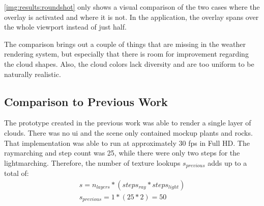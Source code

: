 \begin{figure}[H]
    \centering
    \label{img:results:roundshot}
\end{figure}

\noindent
\autoref{img:results:roundshot} only shows a visual comparison of the two cases where the overlay is activated and where it is not.
In the application, the overlay spans over the whole viewport instead of just half.

\noindent
The comparison brings out a couple of things that are missing in the weather rendering system, but especially that there is room for improvement regarding the cloud shapes.
Also, the cloud colors lack diversity and are too uniform to be naturally realistic.

\clearpage

\subsection{Comparison to Previous Work}
\label{section:techimpl:comparison}
The prototype created in the previous work was able to render a single layer of clouds. There was no \gls{ui} and the scene only contained mockup plants and rocks.
That implementation was able to run at approximately 30 \gls{fps} in Full HD. The \gls{raymarching} and step count was 25, while there were only two steps for the \gls{lightmarching}.
Therefore, the number of texture lookups $s_{previous}$ adds up to a total of:
$$
\begin{array}{l}
    s = n_{layers} * (steps_{ray} * steps_{light}) \\
    s_{previous} = 1 * (25 * 2) = 50
\end{array}
$$

